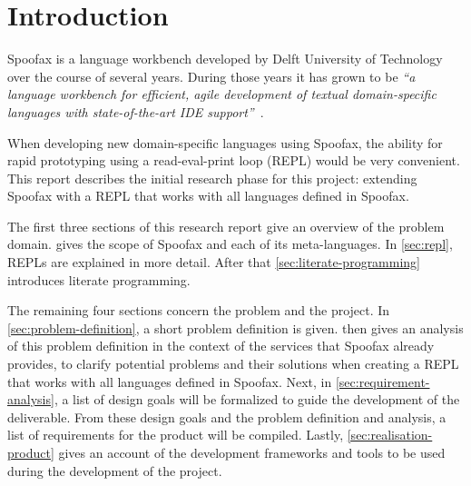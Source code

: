 \section*{Introduction}
\label{sec:introduction}

Spoofax is a language workbench developed by Delft University of
Technology over the course of several years. During those years it has
grown to be \textit{``a language workbench for efficient, agile
  development of textual domain-specific languages with
  state-of-the-art IDE support''}~\cite{Kats10a}.

When developing new domain-specific languages using Spoofax, the
ability for rapid prototyping using a read-eval-print loop (REPL)
would be very convenient. This report describes the initial research
phase for this project: extending Spoofax with a REPL that works with
all languages defined in Spoofax.

The first three sections of this research report give an overview of
the problem domain.  gives the scope of Spoofax and
each of its meta-languages. In \cref{sec:repl}, REPLs are explained in
more detail. After that \cref{sec:literate-programming} introduces
literate programming.

The remaining four sections concern the problem and the project. In
\cref{sec:problem-definition}, a short problem definition is given.
 then gives an analysis of this problem
definition in the context of the services that Spoofax already
provides, to clarify potential problems and their solutions when
creating a REPL that works with all languages defined in Spoofax.
Next, in \cref{sec:requirement-analysis}, a list of design goals will
be formalized to guide the development of the deliverable. From these
design goals and the problem definition and analysis, a list of
requirements for the product will be compiled. Lastly,
\cref{sec:realisation-product} gives an account of the development
frameworks and tools to be used during the development of the
project.


